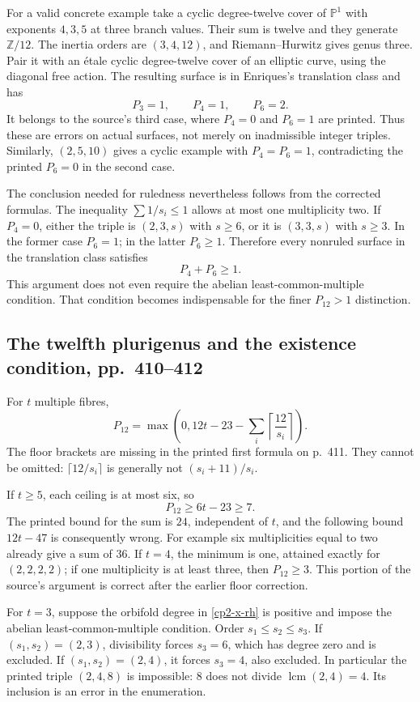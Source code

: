 For a valid concrete example take a cyclic degree-twelve cover of $\mathbb P^1$ with exponents $4,3,5$ at three branch values. Their sum is twelve and they generate $\mathbb Z/12$. The inertia orders are $(3,4,12)$, and Riemann--Hurwitz gives genus three. Pair it with an étale cyclic degree-twelve cover of an elliptic curve, using the diagonal free action. The resulting surface is in Enriques's translation class and has
\[
 P_3=1,\qquad P_4=1,\qquad P_6=2.
\]
It belongs to the source's third case, where $P_4=0$ and $P_6=1$ are printed. Thus these are errors on actual surfaces, not merely on inadmissible integer triples. Similarly, $(2,5,10)$ gives a cyclic example with $P_4=P_6=1$, contradicting the printed $P_6=0$ in the second case.

The conclusion needed for ruledness nevertheless follows from the corrected formulas. The inequality $\sum1/s_i\leq1$ allows at most one multiplicity two. If $P_4=0$, either the triple is $(2,3,s)$ with $s\geq6$, or it is $(3,3,s)$ with $s\geq3$. In the former case $P_6=1$; in the latter $P_6\geq1$. Therefore every nonruled surface in the translation class satisfies
\[
 P_4+P_6\geq1.
\]
This argument does not even require the abelian least-common-multiple condition. That condition becomes indispensable for the finer $P_{12}>1$ distinction.

\subsection{The twelfth plurigenus and the existence condition, pp.~410--412}

For $t$ multiple fibres,
\[
 P_{12}=\max\left(0,12t-23-\sum_i\left\lceil\frac{12}{s_i}\right\rceil\right).
\]
The floor brackets are missing in the printed first formula on p.~411. They cannot be omitted: $\lceil12/s_i\rceil$ is generally not $(s_i+11)/s_i$.

If $t\geq5$, each ceiling is at most six, so
\[
 P_{12}\geq6t-23\geq7.
\]
The printed bound for the sum is $24$, independent of $t$, and the following bound $12t-47$ is consequently wrong. For example six multiplicities equal to two already give a sum of $36$. If $t=4$, the minimum is one, attained exactly for $(2,2,2,2)$; if one multiplicity is at least three, then $P_{12}\geq3$. This portion of the source's argument is correct after the earlier floor correction.

For $t=3$, suppose the orbifold degree in \eqref{cp2-x-rh} is positive and impose the abelian least-common-multiple condition. Order $s_1\leq s_2\leq s_3$. If $(s_1,s_2)=(2,3)$, divisibility forces $s_3=6$, which has degree zero and is excluded. If $(s_1,s_2)=(2,4)$, it forces $s_3=4$, also excluded. In particular the printed triple $(2,4,8)$ is impossible: $8$ does not divide $\operatorname{lcm}(2,4)=4$. Its inclusion is an error in the enumeration.

